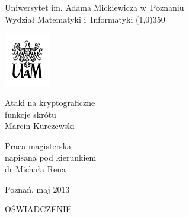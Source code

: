 \documentclass[12pt,a4paper,twoside]{article}
\begin{document}
\onehalfspacing
\newcommand{\myparagraph}[1]{\paragraph{#1}\mbox{}\\}
\newcommand{\latin}[1]{\foreignlanguage{latin}{\textit{#1}}}
\newcommand{\en}[1]{\foreignlanguage{english}{\textit{#1}}}
\newcommand{\abbr}[1]{\textit{#1}}
\newenvironment{myenumerate}
    {\begin{enumerate}[label*=\arabic*.]}
    {\end{enumerate}}
\DeclarePairedDelimiter{\ceil}{\lceil}{\rceil}
\DeclarePairedDelimiter{\floor}{\lfloor}{\rfloor}

\begin{titlepage}
    \begin{center}
    {\LARGE Uniwersytet im. Adama Mickiewicza w~Poznaniu \\
    Wydział Matematyki i~Informatyki}
    \line(1,0){350}

    \vspace{1cm}
    \includegraphics[width=2cm]{logo-uam/logo-uam.png}
    \vspace{1cm}

    \vspace{1cm}
    {\Huge Ataki na kryptograficzne \\ funkcje skrótu} \\[0.5cm]
    {\Large Marcin Kurczewski}
    \end{center}

    \vspace{3cm}
    \hspace{8cm}\parbox[l]{6cm}{\Large Praca magisterska \\
    napisana pod kierunkiem \\
    dr Michała Rena}

    \begin{center}
    \vspace{4cm}
    Poznań, maj 2013
    \end{center}
\end{titlepage}


\newpage
\thispagestyle{empty}
\begin{center}
    OŚWIADCZENIE
\end{center}
\end{document}
